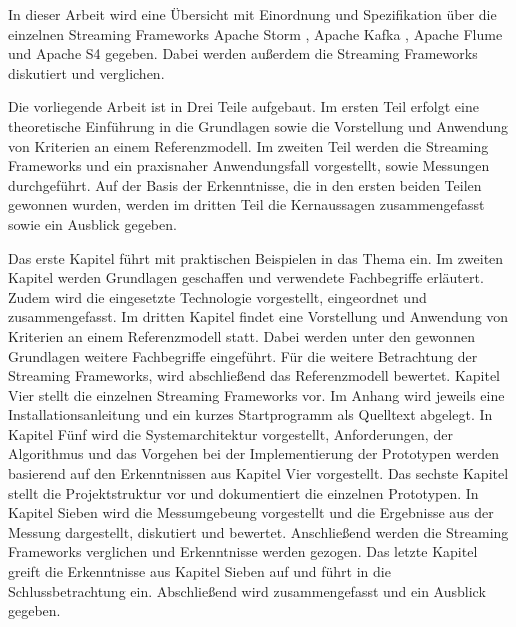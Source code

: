 In dieser Arbeit wird eine Übersicht mit Einordnung und Spezifikation über die einzelnen Streaming Frameworks Apache Storm , Apache Kafka , Apache Flume  und Apache S4  gegeben. Dabei werden außerdem die Streaming Frameworks diskutiert und verglichen. 


Die vorliegende Arbeit ist in Drei Teile aufgebaut. Im ersten Teil erfolgt eine theoretische Einführung in die Grundlagen sowie die Vorstellung und Anwendung von Kriterien an einem Referenzmodell. Im zweiten Teil werden die Streaming Frameworks und ein praxisnaher Anwendungsfall vorgestellt, sowie Messungen durchgeführt. 
Auf der Basis der Erkenntnisse, die in den ersten beiden Teilen gewonnen wurden, werden im dritten Teil die Kernaussagen zusammengefasst sowie ein Ausblick gegeben.

Das erste Kapitel führt mit praktischen Beispielen in das Thema ein. Im zweiten Kapitel werden Grundlagen geschaffen und verwendete Fachbegriffe erläutert. Zudem wird die eingesetzte Technologie vorgestellt, eingeordnet und zusammengefasst. 
Im dritten Kapitel findet eine Vorstellung und Anwendung von Kriterien an einem Referenzmodell statt. Dabei werden unter den gewonnen Grundlagen weitere Fachbegriffe eingeführt. Für die weitere Betrachtung der Streaming Frameworks, wird abschließend das Referenzmodell bewertet.
Kapitel Vier stellt die einzelnen Streaming Frameworks vor. Im Anhang wird jeweils eine Installationsanleitung und ein kurzes Startprogramm als Quelltext abgelegt.
In Kapitel Fünf wird die Systemarchitektur vorgestellt, Anforderungen, der Algorithmus und das Vorgehen bei der Implementierung der Prototypen werden basierend auf den Erkenntnissen aus Kapitel Vier vorgestellt.
Das sechste Kapitel stellt die Projektstruktur vor und dokumentiert die einzelnen Prototypen. In Kapitel Sieben wird die Messumgebeung vorgestellt und die Ergebnisse aus der Messung dargestellt, diskutiert und bewertet. Anschließend werden die Streaming Frameworks verglichen und Erkenntnisse werden gezogen.
Das letzte Kapitel greift die Erkenntnisse aus Kapitel Sieben auf und führt in die Schlussbetrachtung ein. Abschließend wird zusammengefasst und ein Ausblick gegeben.